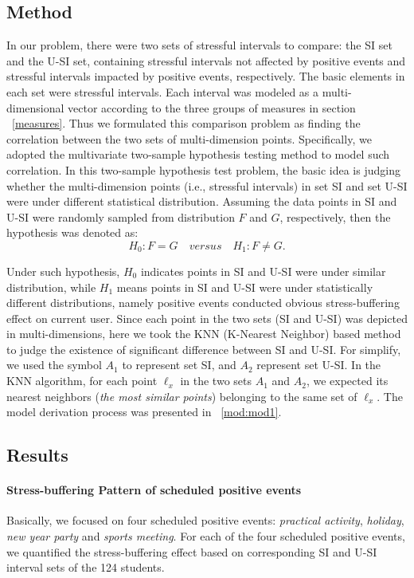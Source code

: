 \subsection{Method}
In our problem,
there were two sets of stressful intervals to compare:
the SI set and the U-SI set,
containing stressful intervals not affected by positive events
and stressful intervals impacted by positive events, respectively.
The basic elements in each set were stressful intervals.
Each interval was modeled as a multi-dimensional vector according to the three groups of measures in section ~\ref{measures}.
Thus we formulated this comparison problem as finding the correlation between the two sets of multi-dimension points.
Specifically, we adopted the multivariate two-sample hypothesis testing method
\cite{Li2017Correlating,Johnson2012Applied} to model such correlation.
In this two-sample hypothesis test problem,
the basic idea is judging whether the multi-dimension points (i.e., stressful intervals)
in set SI and set U-SI were under different statistical distribution.
Assuming the data points in SI and U-SI were randomly sampled from distribution $F$ and $G$, respectively,
then the hypothesis was denoted as:
\begin{equation}
H_0: F = G \quad versus \quad H_1: F \neq G.
\end{equation}

Under such hypothesis,
$H_0$ indicates points in SI and U-SI were under similar distribution,
while $H_1$ means points in SI and U-SI were under statistically different distributions,
namely positive events conducted obvious stress-buffering effect on current user.
Since each point in the two sets (SI and U-SI) was depicted in multi-dimensions,
here we took the KNN (K-Nearest Neighbor) \cite{Schilling1986Multivariate}
based method to judge the existence of significant difference between SI and U-SI.
For simplify, we used the symbol $A_1$ to represent set SI,
and $A_2$ represent set U-SI.
In the KNN algorithm,
for each point $\ell_{x}$ in the two sets $A_1$ and $A_2$,
we expected its nearest neighbors (\emph{the most similar points}) belonging to the same set of $\ell_x$.
The model derivation process was presented in ~\ref{mod:mod1}.

\subsection{Results}
\paragraph{Stress-buffering Pattern of scheduled positive events}
Basically, we focused on four scheduled positive events:
\emph{practical activity}, \emph{holiday}, \emph{new year party} and \emph{sports meeting}.
For each of the four scheduled positive events,
we quantified the stress-buffering effect based on corresponding SI and U-SI interval sets of the 124 students.

